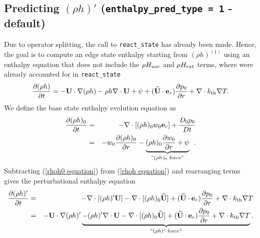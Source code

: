 \subsection{Predicting $(\rho h)'$ ({\tt enthalpy\_pred\_type = 1} - default)}
Due to operator splitting, the call to {\tt react\_state} has already
been made.  Hence, the goal is to compute an edge state enthalpy
starting from $(\rho h)^{(1)}$ using an enthalpy equation that does
not include the $\rho H_{\rm nuc}$ and $\rho H_{\rm ext}$ terms, where
were already accounted for in {\tt react\_state}
\begin{equation}
\frac{\partial(\rho h)}{\partial t} = -{\bf U}\cdot\nabla(\rho h) - \rho h\nabla\cdot{\bf U} 
+ \psi + (\widetilde{{\bf U}} \cdot \mathbf{e}_r) \frac{\partial p_0}{\partial r} + \nabla\cdot k_{\rm th}\nabla T. \label{rhoh equation}
\end{equation}
We define the base state enthalpy evolution equation as
\begin{eqnarray}
\frac{\partial(\rho h)_0}{\partial t} &=& -\nabla\cdot[(\rho h)_0 w_0{\bf e}_r] 
+ \frac{D_0p_0}{Dt} \nonumber \\
&=& -w_0\frac{\partial(\rho h)_0}{\partial r} 
- \underbrace{(\rho h)_0\frac{\partial w_0}{\partial r}+ \psi}_{"(\rho h)_0 ~ \text{force}"}
\enskip .\label{rhoh0 equation}
\end{eqnarray}
Subtracting (\ref{rhoh0 equation}) from (\ref{rhoh equation}) and rearranging terms gives 
the perturbational enthalpy equation
\begin{eqnarray}
\frac{\partial(\rho h)'}{\partial t} &=& -\nabla\cdot[(\rho h)'{\bf U}] 
- \nabla\cdot[(\rho h)_0\widetilde{{\bf U}}] + (\widetilde{{\bf U}} \cdot \mathbf{e}_r)\frac{\partial p_0}{\partial r} 
+ \nabla\cdot k_{\rm th}\nabla T\nonumber \\
&=& -{\bf U}\cdot\nabla(\rho h)' \underbrace{- (\rho h)'\nabla\cdot{\bf U} 
- \nabla\cdot[(\rho h)_0\widetilde{{\bf U}}] + (\widetilde{{\bf U}} \cdot \mathbf{e}_r)\frac{\partial p_0}{\partial r}
+ \nabla\cdot k_{\rm th}\nabla T}_{"(\rho h)' ~ \text{force}"}. \label{rhohprime equation}
\end{eqnarray}

